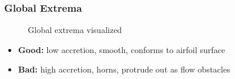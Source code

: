 \documentclass[9pt]{beamer}
\begin{document}
\begin{frame}
\frametitle{Global Extrema}
\label{sec-3-19}

\vspace*{-0.0cm}\begin{figure}
      \caption{Global extrema visualized}
\end{figure}
\begin{itemize}
\item \textbf{Good:} low accretion, smooth, conforms to airfoil surface
\item \textbf{Bad:} high accretion, horns, protrude out as flow obstacles
\end{itemize}
\end{frame}
\end{document}
